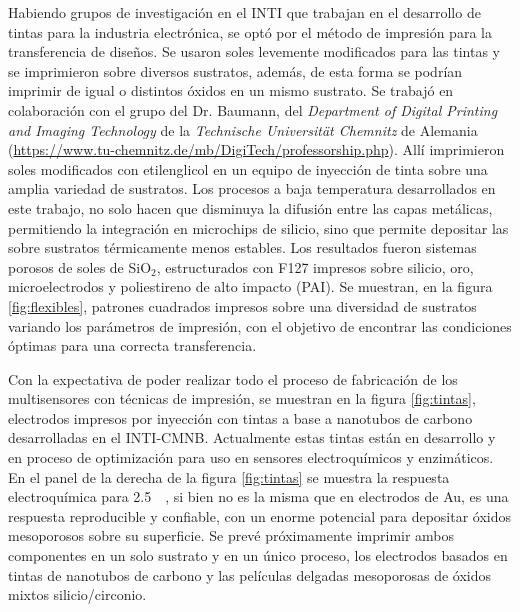  	  Habiendo grupos de investigación en el INTI que trabajan en el desarrollo de tintas para la industria electrónica, se optó por el método de impresión para la transferencia de diseños. Se usaron soles levemente modificados para las tintas y se imprimieron sobre diversos sustratos, además, de esta forma se podrían imprimir \pdm\space de igual o distintos óxidos en un mismo sustrato. Se trabajó en colaboración con el grupo del Dr. Baumann, del \textit{Department of Digital Printing and Imaging Technology} de la \textit{Technische Universität Chemnitz} de Alemania (\url{https://www.tu-chemnitz.de/mb/DigiTech/professorship.php}). Allí imprimieron soles modificados con etilenglicol en un equipo de inyección de tinta sobre una amplia variedad de sustratos. Los procesos a baja temperatura desarrollados en este trabajo, no solo hacen que disminuya la difusión entre las capas metálicas, permitiendo la integración en microchips de silicio, sino que permite depositar las \pdm\space sobre sustratos térmicamente menos estables. Los resultados fueron sistemas porosos de soles de SiO$_2$, estructurados con F127 impresos sobre silicio, oro, microelectrodos y poliestireno de alto impacto (PAI). Se muestran, en la figura \ref{fig:flexibles}, patrones cuadrados impresos sobre una diversidad de sustratos variando los parámetros de impresión, con el objetivo de encontrar las condiciones óptimas para una correcta transferencia.

 	  Con la expectativa de poder realizar todo el proceso de fabricación de los multisensores con técnicas de impresión, se muestran en la figura \ref{fig:tintas}, electrodos impresos por inyección con tintas a base a nanotubos de carbono desarrolladas en el INTI-CMNB. Actualmente estas tintas están en desarrollo y en proceso de optimización para uso en sensores electroquímicos y enzimáticos\cite{longinotti2010,Mass2016}. En el panel de la derecha de la figura \ref{fig:tintas} se muestra la respuesta electroquímica para \fe\space \SI{2.5}{\milli\Molar}, si bien no es la misma que en electrodos de Au, es una respuesta reproducible y confiable, con un enorme potencial para depositar óxidos mesoporosos sobre su superficie. Se prevé próximamente imprimir ambos componentes en un solo sustrato y en un único proceso, los electrodos basados en tintas de nanotubos de carbono y las películas delgadas mesoporosas de óxidos mixtos silicio/circonio.

